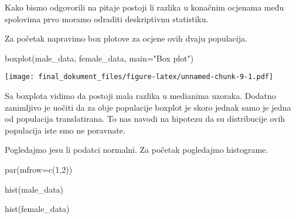 \documentclass[
]{article}
\newenvironment{Shaded}{\begin{snugshade}}{\end{snugshade}}
\newcommand{\AttributeTok}[1]{\textcolor[rgb]{0.77,0.63,0.00}{#1}}
\newcommand{\ConstantTok}[1]{\textcolor[rgb]{0.00,0.00,0.00}{#1}}
\newcommand{\DecValTok}[1]{\textcolor[rgb]{0.00,0.00,0.81}{#1}}
\newcommand{\FunctionTok}[1]{\textcolor[rgb]{0.00,0.00,0.00}{#1}}
\newcommand{\NormalTok}[1]{#1}
\newcommand{\OtherTok}[1]{\textcolor[rgb]{0.56,0.35,0.01}{#1}}
\newcommand{\SpecialCharTok}[1]{\textcolor[rgb]{0.00,0.00,0.00}{#1}}
\newcommand{\StringTok}[1]{\textcolor[rgb]{0.31,0.60,0.02}{#1}}
\begin{document}
\begin{Shaded}
\end{Shaded}

Kako bismo odgovorili na pitaje postoji li razlika u konačnim ocjenama
među spolovima prvo moramo odraditi deskriptivnu statistiku.

Za početak napravimo box plotove za ocjene ovih dvaju populacija.

\begin{Shaded}
\begin{Highlighting}[]
\FunctionTok{boxplot}\NormalTok{(male\_data, female\_data, }\AttributeTok{main=}\StringTok{"Box plot"}\NormalTok{)}
\end{Highlighting}
\end{Shaded}

\texttt{[image: final\_dokument\_files/figure-latex/unnamed-chunk-9-1.pdf]}

Sa boxplota vidimo da postoji mala razlika u medianima uzoraka. Dodatno
zanimljivo je uočiti da za obje populacije boxplot je skoro jednak samo
je jedna od populacija translatirana. To nas navodi na hipotezu da su
distribucije ovih populacija iste smo ne poravnate.

Pogledajmo jesu li podatci normalni. Za početak pogledajmo histograme.

\begin{Shaded}
\begin{Highlighting}[]
\FunctionTok{par}\NormalTok{(}\AttributeTok{mfrow=}\FunctionTok{c}\NormalTok{(}\DecValTok{1}\NormalTok{,}\DecValTok{2}\NormalTok{))}

\FunctionTok{hist}\NormalTok{(male\_data)}

\FunctionTok{hist}\NormalTok{(female\_data)}
\end{Highlighting}
\end{Shaded}
\end{document}
